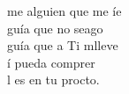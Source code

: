\begin{cancion}%
	me alguien que me íe\\
	guía que no seago\\
	guía que a Ti mlleve\\
	í pueda comprer\\
	l es en  tu procto. \\
\end{cancion}%
